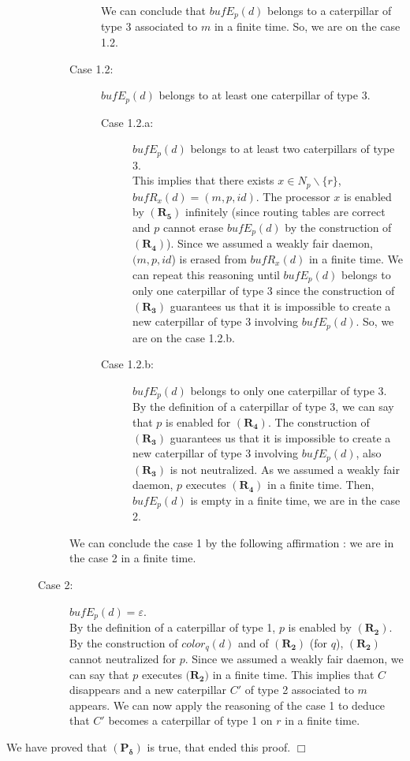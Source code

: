 \documentclass[11pt]{article}
\newenvironment{proof}{{\noindent\bf Proof. } }{{\hfill $\Box$}}
\begin{document}
\begin{proof}
\begin{description}
\begin{description}
\begin{description}
\begin{description}
\end{description}

We can conclude that $bufE_{p}(d)$ belongs to a caterpillar of type 3 associated to $m$ in a finite time. So, we are on the case 1.2.

\item [Case 1.2:] $bufE_{p}(d)$ belongs to at least one caterpillar of type 3.

\begin{description}
\item [Case 1.2.a:] $bufE_{p}(d)$ belongs to at least two caterpillars of type 3.\\
This implies that there exists $x\in N_{p}\backslash\{r\}$, $bufR_{x}(d)=(m,p,id)$. The processor $x$ is enabled by $\boldsymbol{(R_{5})}$ infinitely (since routing tables are correct and $p$ cannot erase $bufE_{p}(d)$ by the construction of $\boldsymbol{(R_{4})}$). Since we assumed a weakly fair daemon, $(m,p,id$) is erased from $bufR_{x}(d)$ in a finite time. We can repeat this reasoning until $bufE_{p}(d)$ belongs to only one caterpillar of type 3 since the construction of $\boldsymbol{(R_{3})}$ guarantees us that it is impossible to create a new caterpillar of type $3$ involving $bufE_{p}(d)$. So, we are on the case 1.2.b.
\item [Case 1.2.b:] $bufE_{p}(d)$ belongs to only one caterpillar of type 3.\\
By the definition of a caterpillar of type 3, we can say that $p$ is enabled for $\boldsymbol{(R_{4})}$. The construction of $\boldsymbol{(R_{3})}$ guarantees us that it is impossible to create a new caterpillar of type $3$ involving $bufE_{p}(d)$, also $\boldsymbol{(R_{3})}$ is not neutralized. As we assumed a weakly fair daemon, $p$  executes $\boldsymbol{(R_{4})}$ in a finite time. Then, $bufE_{p}(d)$ is empty in a finite time, we are in the case 2.
\end{description}

\end{description}

We can conclude the case 1 by the following affirmation : we are in the case 2 in a finite time.

\item [Case 2:] $bufE_{p}(d)=\varepsilon$.\\
By the definition of a caterpillar of type 1, $p$ is enabled by $\boldsymbol{(R_{2})}$. By the construction of $color_{q}(d)$ and of $\boldsymbol{(R_{2})}$ (for $q$), $\boldsymbol{(R_{2})}$ cannot neutralized for $p$. Since we assumed a weakly fair daemon, we can say that $p$ executes $\boldsymbol{(R_{2}})$ in a finite time. This implies that $C$ disappears and a new caterpillar $C'$ of type 2 associated to $m$ appears. We can now apply the reasoning of the case 1 to deduce that $C'$ becomes a caterpillar of type 1 on $r$ in a finite time.
\end{description}

\end{description}

We have proved that $\mathbf{(P_{\delta})}$ is true, that ended this proof.
\end{proof}
\end{document}
